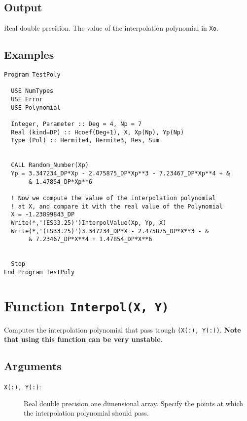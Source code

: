 \subsection{Output}

Real double precision. The value of the interpolation polynomial in
\texttt{Xo}. 


\subsection{Examples}

\begin{lstlisting}[emph=InterpolValue,
                   emphstyle=\color{blue},
                   frame=trBL,
                   caption=Compute values of the Interpolation polynomial.,
                   label=interpolvalue]
Program TestPoly

  USE NumTypes
  USE Error
  USE Polynomial

  Integer, Parameter :: Deg = 4, Np = 7
  Real (kind=DP) :: Hcoef(Deg+1), X, Xp(Np), Yp(Np)
  Type (Pol) :: Hermite4, Hermite3, Res, Sum


  CALL Random_Number(Xp)
  Yp = 3.347234_DP*Xp - 2.475875_DP*Xp**3 - 7.23467_DP*Xp**4 + &
       & 1.47854_DP*Xp**6

  ! Now we compute the value of the interpolation polynomial
  ! at X, and compare it with the real value of the Polynomial
  X = -1.23899843_DP
  Write(*,'(ES33.25)')InterpolValue(Xp, Yp, X)
  Write(*,'(ES33.25)')3.347234_DP*X - 2.475875_DP*X**3 - &
       & 7.23467_DP*X**4 + 1.47854_DP*X**6


  Stop
End Program TestPoly
\end{lstlisting}

\section{Function \texttt{Interpol(X, Y)}}

Computes the interpolation polynomial that pass trough
\texttt{(X(:), Y(:))}. \textbf{Note that using this function can be
very unstable}.

\subsection{Arguments}

\begin{description}
\item[\texttt{X(:), Y(:)}:] Real double precision one dimensional
  array. Specify the points at which the interpolation polynomial
  should pass. 
\end{description}


